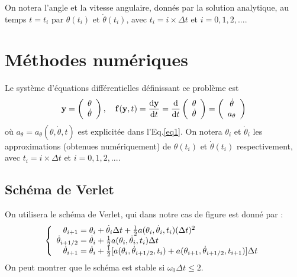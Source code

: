 \documentclass[a4paper,12pt,oneside]{article}
\def \be {\begin{equation}}
\def \ee {\end{equation}}
\def \dd  {{\rm d}}
\def \t {\theta}
\def \vt {\Dot{\theta}}
\begin{document}
On notera l'angle et la vitesse angulaire, donnés par la solution analytique, au temps $t=t_i$ par $\t(t_i)$ et $\vt(t_i)$, avec $t_i=i \times \Delta t$ et $i=0,1,2,...$.



\newpage \section{Méthodes numériques}
Le système d'équations différentielles définissant ce problème est
\be \label{sysDef}
\mathbf{y}  
=  \left( \begin{array}{c} \t \\ \vt \end{array} \right), \quad 
\mathbf{f}(\mathbf{y},t)  
=  \frac{\dd \mathbf{y}}{\dd t}  
=  \frac{\dd }{\dd t}\left( \begin{array}{c} \t \\ \vt \end{array} \right) 
=  \left( \begin{array}{c} \vt \\ a_\t  \end{array} \right)
\ee
où $a_\t=a_\t(\t,\vt,t)$ est explicitée dans l'Eq.\eqref{eq1}.
On notera $\t_i$ et $\vt_i$ les approximations (obtenues numériquement) de $\t(t_i)$ et $\vt(t_i)$ respectivement, avec $t_i=i \times \Delta t$ et $i=0,1,2,...$. 


\subsection{Schéma de Verlet \cite{notesDeCours}}
On utilisera le schéma de Verlet, qui dans notre cas de figure est donné par :
\be
\left\{ \begin{array}{r @{{}={}} l} 
\t_{i+1} & \t_{i} 
             + \vt_{i} \Delta t 
             + \frac{1}{2}a(\t_{i},\vt_{i},t_{i}) (\Delta t)^2\\
\vt_{i+1/2} & \vt_{i}
                 + \frac{1}{2}a(\t_{i},\vt_{i},t_{i}) \Delta t \\
\vt_{i+1} & \vt_{i} 
               + \frac{1}{2}[a(\t_{i},\vt_{i+1/2},t_{i})+a(\t_{i+1},\vt_{i+1/2},t_{i+1})] \Delta t
\end{array} \right.
\ee
On peut montrer que le schéma est stable si $\omega_0 \Delta t \leq 2$.
\end{document}

